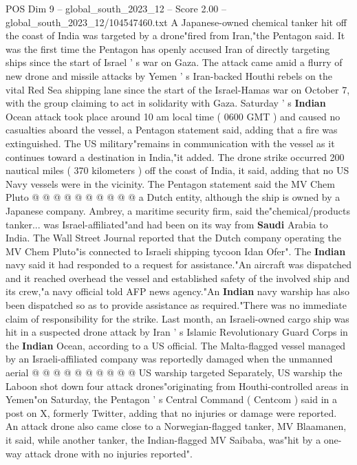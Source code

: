\begin{textsample}{POS Dim 9 – global\_south\_2023\_12 – Score 2.00 – global\_south\_2023\_12/104547460.txt}  \label{ex:f9_pos_141}
A Japanese-owned chemical tanker hit off the coast of India was targeted by a drone"fired from Iran,"the Pentagon said.
It was the first time the Pentagon has openly accused Iran of directly targeting ships since the start of Israel ' s war on Gaza.
The attack came amid a flurry of new drone and missile attacks by Yemen ' s Iran-backed Houthi rebels on the vital Red Sea shipping lane since the start of the Israel-Hamas war on October 7, with the group claiming to act in solidarity with Gaza.
Saturday ' s \textbf{Indian} Ocean attack took place around 10 am local time ( 0600 GMT ) and caused no casualties aboard the vessel, a Pentagon statement said, adding that a fire was extinguished.
The US military"remains in communication with the vessel as it continues toward a destination in India,"it added.
The drone strike occurred 200 nautical miles ( 370 kilometers ) off the coast of India, it said, adding that no US Navy vessels were in the vicinity.
The Pentagon statement said the MV Chem Pluto @ @ @ @ @ @ @ @ @ @ a Dutch entity, although the ship is owned by a Japanese company.
Ambrey, a maritime security firm, said the"chemical/products tanker... was Israel-affiliated"and had been on its way from \textbf{Saudi} Arabia to India.
The Wall Street Journal reported that the Dutch company operating the MV Chem Pluto"is connected to Israeli shipping tycoon Idan Ofer".
The \textbf{Indian} navy said it had responded to a request for assistance."An aircraft was dispatched and it reached overhead the vessel and established safety of the involved ship and its crew,"a navy official told AFP news agency."An \textbf{Indian} navy warship has also been dispatched so as to provide assistance as required."There was no immediate claim of responsibility for the strike.
Last month, an Israeli-owned cargo ship was hit in a suspected drone attack by Iran ' s Islamic Revolutionary Guard Corps in the \textbf{Indian} Ocean, according to a US official.
The Malta-flagged vessel managed by an Israeli-affiliated company was reportedly damaged when the unmanned aerial @ @ @ @ @ @ @ @ @ @ US warship targeted Separately, US warship the Laboon shot down four attack drones"originating from Houthi-controlled areas in Yemen"on Saturday, the Pentagon ' s Central Command ( Centcom ) said in a post on X, formerly Twitter, adding that no injuries or damage were reported.
An attack drone also came close to a Norwegian-flagged tanker, MV Blaamanen, it said, while another tanker, the Indian-flagged MV Saibaba, was"hit by a one-way attack drone with no injuries reported".

\end{textsample}
